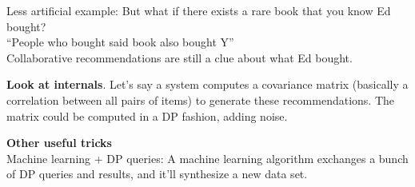 \begin{example}
Less artificial example: But what if there exists a rare book that you know Ed bought?\\
	\hspace*{1cm} ``People who bought said book also bought Y''\\
Collaborative recommendations are still a clue about what Ed bought.
\end{example}

\textbf{Look at internals}. Let's say a system computes a covariance matrix (basically a correlation between all pairs of items) to generate these recommendations. The matrix could be computed in a DP fashion, adding noise.

\textbf{Other useful tricks}\\
Machine learning + DP queries: A machine learning algorithm exchanges a bunch of DP queries and results, and it'll synthesize a new data set.

